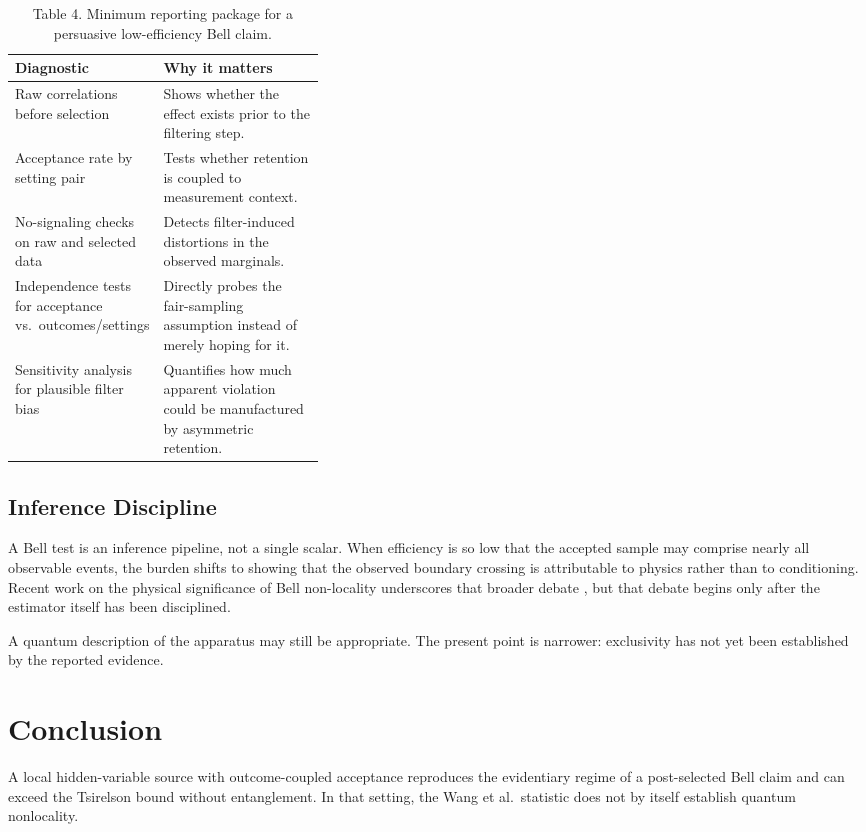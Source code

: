 \documentclass[11pt]{article}
\begin{document}
\begin{table}[t]
\centering
\caption{Table 4. Minimum reporting package for a persuasive low-efficiency Bell claim.}
\begin{tabularx}{\linewidth}{@{}p{0.36\linewidth}Y@{}}
\toprule
Diagnostic & Why it matters \\
\midrule
Raw correlations before selection & Shows whether the effect exists prior to the filtering step. \\
Acceptance rate by setting pair & Tests whether retention is coupled to measurement context. \\
No-signaling checks on raw and selected data & Detects filter-induced distortions in the observed marginals. \\
Independence tests for acceptance vs.~outcomes/settings & Directly probes the fair-sampling assumption instead of merely hoping for it. \\
Sensitivity analysis for plausible filter bias & Quantifies how much apparent violation could be manufactured by asymmetric retention. \\
\bottomrule
\end{tabularx}
\end{table}

\subsection{Inference Discipline}

A Bell test is an inference pipeline, not a single scalar. When efficiency is so low that the accepted sample may comprise nearly all observable events, the burden shifts to showing that the observed boundary crossing is attributable to physics rather than to conditioning. Recent work on the physical significance of Bell non-locality underscores that broader debate \cite{vieira2025}, but that debate begins only after the estimator itself has been disciplined.

A quantum description of the apparatus may still be appropriate. The present point is narrower: exclusivity has not yet been established by the reported evidence.

\section{Conclusion}

A local hidden-variable source with outcome-coupled acceptance reproduces the evidentiary regime of a post-selected Bell claim and can exceed the Tsirelson bound without entanglement. In that setting, the Wang et al.~statistic does not by itself establish quantum nonlocality.
\end{document}
